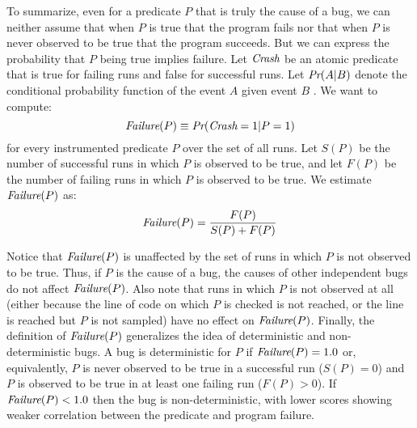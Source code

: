 To summarize, even for a predicate $P$ that is truly the cause of a bug, we can neither assume that
when $P$ is true that
the program fails nor that when $P$ is never observed to be true  that
the program succeeds.
But we can express the probability that $P$
being true implies failure.  Let $\textit{Crash}$ be an atomic predicate that is
true for failing runs and false for successful runs.  Let $\textit{Pr}(A | B)$ denote
the conditional probability function of the event $A$ given event $B$ .  
We want to compute:
\[ \textit{Failure}(P) \equiv \textit{Pr}(\textit{Crash} = 1 | P = 1) \]
for every instrumented predicate $P$ over the set of all runs.  Let $S(P)$ be the number
of successful runs in which $P$ is observed to be true, and let $F(P)$ be the number of
failing runs in which $P$ is observed to be true.  
We estimate $\textit{Failure}(P)$ as:
\[ \textit{Failure}(P) = \frac{F(P)}{S(P) + F(P)} \]

Notice that $\textit{Failure}(P)$ is unaffected by the set of runs in which
$P$ is not observed to be true.  Thus, if $P$ is the cause of a bug, the
causes of other independent bugs do not affect $\textit{Failure}(P)$.
Also note that runs in which $P$ is not observed at all (either because
the line of code on which $P$ is checked is not reached, or the line is reached
but $P$ is not sampled) have no effect on $\textit{Failure}(P)$.
Finally, the definition of $\textit{Failure}(P)$
generalizes the idea of deterministic and non-deterministic bugs.  A
bug is deterministic for $P$ if $\textit{Failure}(P) = 1.0$ or, equivalently,
$P$ is never observed to be true in a successful run ($S(P) =
0$) and $P$ is observed to be true in at least one failing run ($F(P) > 0$).
If $\textit{Failure}(P) < 1.0$ then the bug is non-deterministic, with
lower scores showing weaker correlation between the predicate and
program failure.

